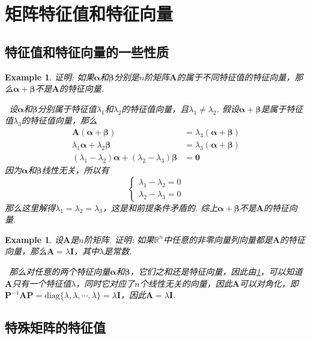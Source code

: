 \documentclass{article}
\newtheorem{example}[theorem]{Example}
\newcommand{\hints}{{\color{blue} \text{hints}}}
\newcommand{\mbf}[1]{\bm{#1}}
\begin{document}
\newpage
\section{矩阵特征值和特征向量}

\subsection{特征值和特征向量的一些性质}

\begin{example}\label{a+b-is-not-eigenvector}
\rm 证明: 如果$\mbf{\alpha}$和$\mbf{\beta}$分别是$n$阶矩阵$\mbf{A}$的属于不同特征值的特征向量，那么$\mbf{\alpha}+\mbf{\beta}$不是$\mbf{A}$的特征向量. 

\hints\ 设$\mbf{\alpha}$和$\mbf{\beta}$分别属于特征值$\lambda_1$和$\lambda_2$的特征值向量，且$\lambda_1 \neq \lambda_2$. 假设$\mbf{\alpha}+\mbf{\beta}$是属于特征值$\lambda_3$的特征值向量，那么
$$
\begin{array}{ll}
\mbf{A}(\mbf{\alpha}+\mbf{\beta}) &= \lambda_3(\mbf{\alpha}+\mbf{\beta}) \\
\lambda_1\mbf{\alpha}+\lambda_2\mbf{\beta} &= \lambda_3(\mbf{\alpha}+\mbf{\beta}) \\  
(\lambda_1 - \lambda_2)\mbf{\alpha} + (\lambda_2 - \lambda_3)\mbf{\beta} &= \mbf{0}
\end{array}
$$
因为$\mbf{\alpha}$和$\mbf{\beta}$线性无关，所以有
$$
\left\{
\begin{array}{ll}
\lambda_1 - \lambda_2 = 0\\
\lambda_2 - \lambda_3 = 0
\end{array}\right.
$$
那么这里解得$\lambda_1 = \lambda_2 = \lambda_3$，这是和前提条件矛盾的. 综上$\mbf{\alpha}+\mbf{\beta}$不是$\mbf{A}$的特征向量.
\end{example}

\begin{example}
\rm 设$\mbf{A}$是$n$阶矩阵. 证明: 如果$\mathbb{R}^n$中任意的非零向量列向量都是$\mbf{A}$的特征向量，那么$\mbf{A}=\lambda\mbf{I}$，其中$\lambda$是常数.

\hints\ 那么对任意的两个特征向量$\mbf{\alpha}$和$\mbf{\beta}$，它们之和还是特征向量，因此由\ref{a+b-is-not-eigenvector}，可以知道$\mbf{A}$只有一个特征值$\lambda$，同时它对应了$n$个线性无关的向量，因此$\mbf{A}$可以对角化，即$\mbf{P}^{-1}\mbf{A}\mbf{P} = \text{diag}\{\lambda,\lambda,\cdots,\lambda\} = \lambda\mbf{I}$，因此$\mbf{A} = \lambda\mbf{I}$.
\end{example}

\subsection{特殊矩阵的特征值}
\end{document}
